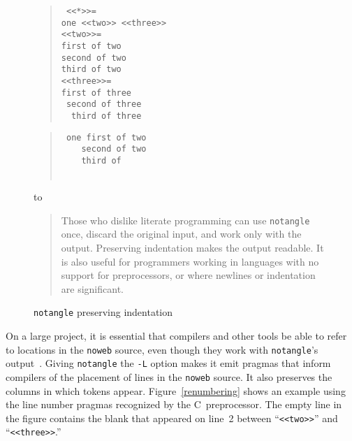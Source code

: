 \begin{figure}
\begin{center}
\noindent
\begin{minipage}[t]{2.5in}
\begin{quote}\tt\obeyspaces
<<*>>=\\
one <<two>> <<three>>\\
<<two>>=\\
first of two\\
second of two\\
third of two\\
<<three>>=\\
first of three\\
\mbox{}\ second of three\\
\mbox{}\ \ third of three
\end{quote}
\end{minipage}\hfil
\begin{minipage}[t]{2.5in}
\begin{quote}\tt\obeyspaces
one\ first\ of\ two\\
\mbox{}\ \ \ \ second\ of\ two\\
\mbox{}\ \ \ \ third\ of\ \\
\mbox{}\\
\mbox{}
\end{quote}
\end{minipage}
\end{center}
\leavevmode\noindent
\hbox to 
\medskip
\begin{quote} 
Those who dislike literate programming can use {\tt notangle} once,
discard the original input, and work only with the output.
Preserving indentation makes the output readable.
It is also useful for programmers working in languages with no support
for preprocessors, or where newlines or indentation are significant.
\end{quote} 
\caption{{\tt notangle} preserving indentation}
\label{indentation}
\end{figure}

On a large project, it is essential that compilers and other tools be
able to refer to locations in the \verb+noweb+ source, even though
they work with \verb+notangle+'s output~\cite{ramsey:literate}.
Giving \verb+notangle+ the  \verb+-L+ option makes it emit pragmas
that inform compilers of the placement of lines
in the \verb+noweb+ source.
It also preserves the columns in which
tokens appear.
Figure~\ref{renumbering} shows an example using the line number
pragmas recognized by the C~preprocessor.
The empty line in the figure contains the blank that appeared on
line~2 between ``\verb+<<two>>+'' and ``\verb+<<three>>+.''

